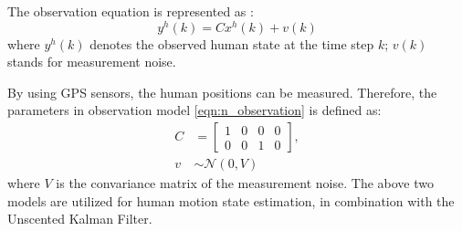 \documentclass[letterpaper, 10 pt, conference]{ieeeconf}
\begin{document}
	
	
	
	\addtocounter{equation}{-2}
	
	The observation equation is represented as : 
	\begin{equation}
		y^h(k)=Cx^h(k)+v(k)\label{eqn:n_observation}
	\end{equation}
	where $y^h(k)$ denotes the observed human state at the time step $k$; $v(k)$ stands for measurement noise. 
	
	By using GPS sensors, the human positions can be measured.
	Therefore, the parameters in observation model \cref{eqn:n_observation} is defined as:
	\begin{subequations}
		\begin{align}\label{eqn:meas_noise}
			C&=\left[
			\begin{array}{cccc}
				1& 0& 0& 0\\
				0& 0& 1& 0
			\end{array}\right],\\
			v&\sim\mathcal{N}(0,V)
		\end{align}
	\end{subequations}
	where $V$ is the convariance matrix of the measurement noise.
	The above two models are utilized for human motion state estimation, in combination with the Unscented Kalman Filter.
	
	
\end{document}
